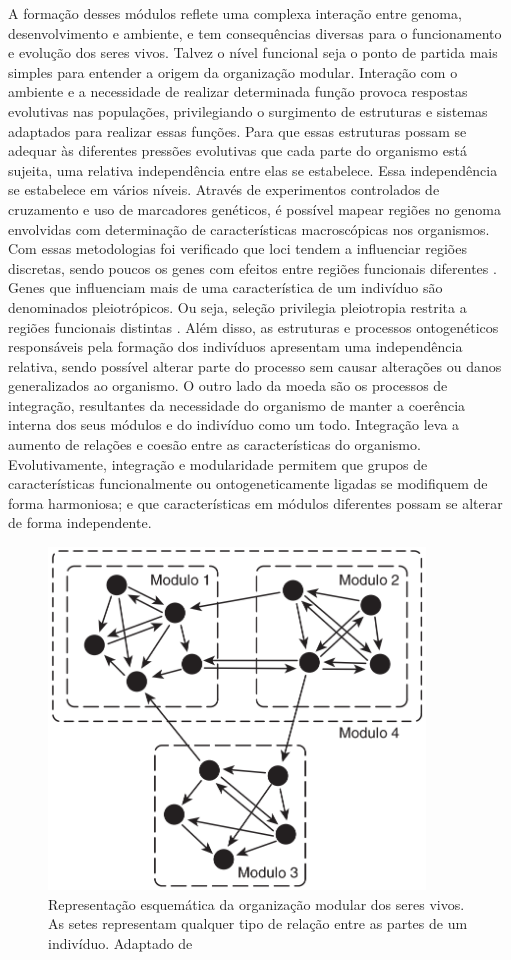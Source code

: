 A formação desses módulos reflete uma complexa interação entre genoma,
desenvolvimento e ambiente, e tem consequências diversas para o
funcionamento e evolução dos seres vivos.
Talvez o nível funcional seja o ponto de partida mais simples para
entender a origem da organização modular.
Interação com o ambiente e a necessidade de realizar determinada função
provoca respostas evolutivas nas populações, privilegiando o surgimento
de estruturas e sistemas adaptados para realizar essas funções.
Para que essas estruturas possam se adequar às diferentes pressões
evolutivas que cada parte do organismo está sujeita, uma relativa
independência entre elas se estabelece.
Essa independência se estabelece em vários níveis.
Através de experimentos controlados de cruzamento e uso de marcadores
genéticos, é possível mapear regiões no genoma envolvidas com
determinação de características macroscópicas nos organismos.
Com essas metodologias foi verificado que loci tendem a influenciar
regiões discretas, sendo poucos os genes com efeitos entre regiões
funcionais diferentes \citep{Cheverud1997}.
Genes que influenciam mais de uma característica de um indivíduo são
denominados pleiotrópicos.
Ou seja, seleção privilegia pleiotropia restrita a regiões funcionais
distintas \citep{Cheverud1984}.
Além disso, as estruturas e processos ontogenéticos responsáveis pela
formação dos indivíduos apresentam uma independência relativa, sendo
possível alterar parte do processo sem causar alterações ou danos
generalizados ao organismo.
O outro lado da moeda são os processos de integração, resultantes da
necessidade do organismo de manter a coerência interna dos seus módulos
e do indivíduo como um todo. 
Integração leva a aumento de relações e coesão entre as características
do organismo.
Evolutivamente, integração e modularidade permitem que grupos de
características funcionalmente ou ontogeneticamente ligadas se
modifiquem de forma harmoniosa; e que características em módulos
diferentes possam se alterar de forma independente.

\begin{figure}[h!]
  \centering
  \includegraphics[width=100mm]{figuras/modulos.png}
  \caption{Representação esquemática da organização modular dos seres
  vivos. As setes representam qualquer tipo de relação entre as partes
  de um indivíduo. Adaptado de \cite{Klingenberg2008}}
  \label{modulos}
\end{figure}

